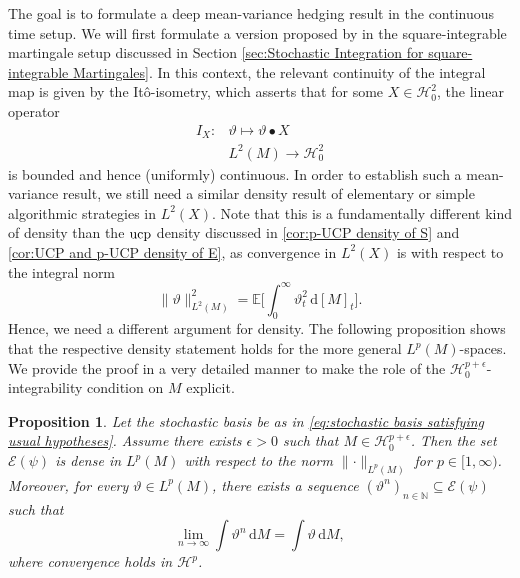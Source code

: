 \documentclass[11pt,a4paper,twoside,openany]{report}
\numberwithin{equation}{section}
\newcommand{\diff}{\mathrm{d}}
\theoremstyle{plain} %
\newtheorem{proposition}[theorem]{Proposition}
\theoremstyle{definition} %
\theoremstyle{remark} %
\let\parencite\authnumparencite
\begin{document}
The goal is to formulate a deep mean-variance hedging result in the continuous time setup. We will first formulate a version proposed by \parencite{Arandjelovic2025} in the square-integrable martingale setup discussed in Section \ref{sec:Stochastic Integration for square-integrable Martingales}. In this context, the relevant continuity of the integral map is given by the Itô-isometry, which asserts that for some \(X\in\mathcal{H}_0^2\), the linear operator
\begin{align*}
    I_X:& \vartheta\mapsto \vartheta\bullet X\\
    &L^2(M)\to \mathcal{H}_0^2
\end{align*}
is bounded and hence (uniformly) continuous. In order to establish such a mean-variance result, we still need a similar density result of elementary or simple algorithmic strategies in \(L^2(X)\). Note that this is a fundamentally different kind of density than the \(\rm{ucp}\) density discussed in \cref{cor:p-UCP density of S} and \cref{cor:UCP and p-UCP density of E}, as convergence in \(L^2(X)\) is with respect to the integral norm 
\begin{equation*}
    \lVert \vartheta\rVert_{L^2(M)}^2=\mathbb{E}\bigg[\int_0^{\infty} \vartheta_t^2\,\diff [M]_t\bigg].
\end{equation*}
Hence, we need a different argument for density. The following proposition shows that the respective density statement holds for the more general \(L^p(M)\)-spaces. We provide the proof in a very detailed manner to make the role of the \(\mathcal{H}^{p+\epsilon}_0\)-integrability condition on \(M\) explicit.
\begin{proposition}\label{prop:Lp(M) density of E(psi)}
    Let the stochastic basis be as in \eqref{eq:stochastic basis satisfying usual hypotheses}. Assume there exists \(\epsilon>0\) such that \(M\in\mathcal{H}_0^{p+\epsilon}\). Then the set \(\mathcal{E}(\psi)\) is dense in \(L^p(M)\) with respect to the norm \(\lVert\cdot\rVert_{L^p(M)}\) for \(p\in[1,\infty)\). Moreover, for every \(\vartheta\in L^p(M)\), there exists a sequence \((\vartheta^n)_{n\in\mathbb{N}}\subseteq\mathcal{E}(\psi)\) such that
    \begin{equation}\label{eq:elementary integrals converge}
        \lim_{n\to\infty}\int \vartheta^n\,\diff M=\int \vartheta\,\diff M,
    \end{equation}
    where convergence holds in \(\mathcal{H}^p\). 
\end{proposition}
\end{document}
